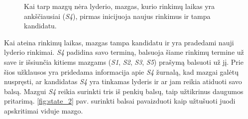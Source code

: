 \documentclass{VUMIFPSkursinis}
\begin{document}
\begin{figure}[H]
\centering

    \hfill
    \caption{Kai tarp mazgų nėra lyderio, mazgas, kurio rinkimų laikas yra ankščiausiai (\textit{S4}), pirmas inicijuoja naujus rinkimus ir tampa kandidatu.}
\end{figure}

Kai ateina rinkimų laikas, mazgas tampa kandidatu ir yra pradedami nauji lyderio rinkimai. \textit{S4} padidina savo terminą, balsuoja šiame rinkimų termine už save ir išsiunčia kitiems mazgams (\textit{S1}, \textit{S2}, \textit{S3}, \textit{S5}) prašymą balsuoti už jį. Prie šios užklausos yra pridedama informacija apie \textit{S4} žurnalą, kad mazgai galėtų nuspręsti, ar kandidatas \textit{S4} yra tinkamas lyderis ir ar jam reikia atiduoti savo balsą. Mazgui \textit{S4} reikia surinkti tris iš penkių balsų, taip užtikrinus daugumos pritarimą. \ref{fig:state_2} pav. surinkti balsai pavaizduoti kaip užtušuoti juodi apskritimai viduje mazgo.
\end{document}
